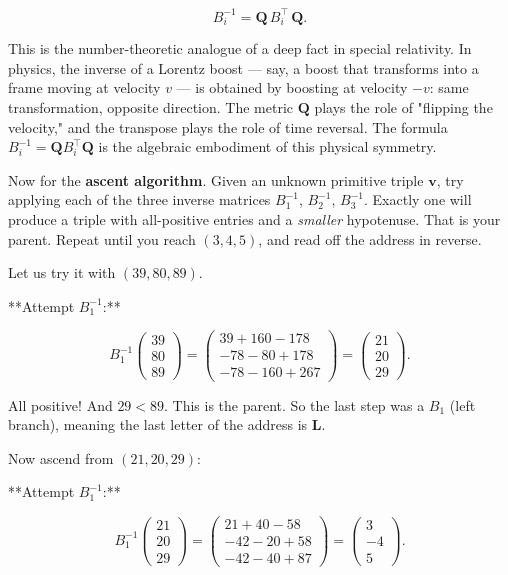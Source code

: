 \documentclass[12pt, letterpaper, openany]{book}
\theoremstyle{definition}
\theoremstyle{remark}
\begin{document}
\[
B_i^{-1} = \mathbf{Q} \, B_i^\top \, \mathbf{Q}.
\]

This is the number-theoretic analogue of a deep fact in special relativity. In physics, the inverse of a Lorentz boost --- say, a boost that transforms into a frame moving at velocity $v$ --- is obtained by boosting at velocity $-v$: same transformation, opposite direction. The metric $\mathbf{Q}$ plays the role of "flipping the velocity," and the transpose plays the role of time reversal. The formula $B_i^{-1} = \mathbf{Q} B_i^\top \mathbf{Q}$ is the algebraic embodiment of this physical symmetry.

Now for the \textbf{ascent algorithm}. Given an unknown primitive triple $\mathbf{v}$, try applying each of the three inverse matrices $B_1^{-1}$, $B_2^{-1}$, $B_3^{-1}$. Exactly one will produce a triple with all-positive entries and a \textit{smaller} hypotenuse. That is your parent. Repeat until you reach $(3, 4, 5)$, and read off the address in reverse.

Let us try it with $(39, 80, 89)$.

**Attempt $B_1^{-1}$:**

\[
B_1^{-1} \begin{pmatrix} 39 \\ 80 \\ 89 \end{pmatrix} = \begin{pmatrix} 39 + 160 - 178 \\ -78 - 80 + 178 \\ -78 - 160 + 267 \end{pmatrix} = \begin{pmatrix} 21 \\ 20 \\ 29 \end{pmatrix}.
\]

All positive! And $29 < 89$. This is the parent. So the last step was a $B_1$ (left branch), meaning the last letter of the address is \textbf{L}.

Now ascend from $(21, 20, 29)$:

**Attempt $B_1^{-1}$:**

\[
B_1^{-1} \begin{pmatrix} 21 \\ 20 \\ 29 \end{pmatrix} = \begin{pmatrix} 21 + 40 - 58 \\ -42 - 20 + 58 \\ -42 - 40 + 87 \end{pmatrix} = \begin{pmatrix} 3 \\ -4 \\ 5 \end{pmatrix}.
\]
\end{document}
